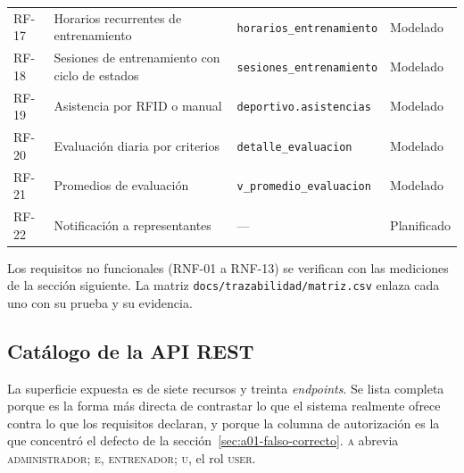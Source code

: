 \documentclass[11pt,a4paper]{article}
\newcommand{\ruta}[1]{\texttt{\footnotesize #1}}
\begin{document}
\begin{longtable}{@{}p{1.3cm}p{7.4cm}p{4.6cm}p{1.7cm}@{}}
RF-17 & Horarios recurrentes de entrenamiento & \texttt{horarios\_entrenamiento} & Modelado \\
RF-18 & Sesiones de entrenamiento con ciclo de estados & \texttt{sesiones\_entrenamiento} & Modelado \\
RF-19 & Asistencia por RFID o manual & \texttt{deportivo.asistencias} & Modelado \\
RF-20 & Evaluación diaria por criterios & \texttt{detalle\_evaluacion} & Modelado \\
RF-21 & Promedios de evaluación & \texttt{v\_promedio\_evaluacion} & Modelado \\
RF-22 & Notificación a representantes & --- & Planificado \\
\bottomrule
\end{longtable}
\renewcommand{\arraystretch}{1}

Los requisitos no funcionales (RNF-01 a RNF-13) se verifican con las
mediciones de la sección siguiente. La matriz
\ruta{docs/trazabilidad/matriz.csv} enlaza cada uno con su prueba y su
evidencia.

\subsection{Catálogo de la API REST}
\label{sec:catalogo-api}

La superficie expuesta es de siete recursos y treinta \emph{endpoints}. Se
lista completa porque es la forma más directa de contrastar lo que el
sistema realmente ofrece contra lo que los requisitos declaran, y porque la
columna de autorización es la que concentró el defecto de la
sección~\ref{sec:a01-falso-correcto}. \textsc{a} abrevia
\textsc{administrador}; \textsc{e}, \textsc{entrenador}; \textsc{u}, el rol
\textsc{user}.
\end{document}
